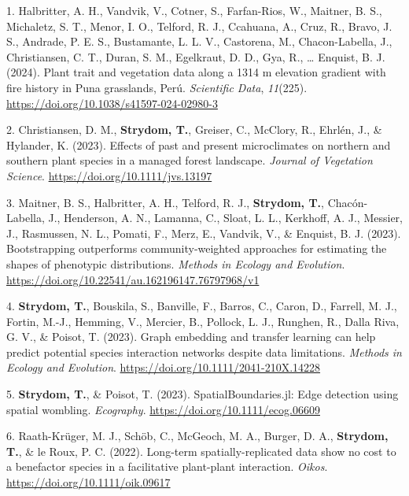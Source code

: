 \documentclass[11pt,a4paper,]{awesome-cv}
\newlength{\cslhangindent}
\newenvironment{CSLReferences}[2] %
 {\begin{list}{}{%
  \setlength{\itemindent}{0pt}
  \setlength{\leftmargin}{0pt}
  \setlength{\parsep}{0pt}
  \ifodd #1
   \setlength{\leftmargin}{\cslhangindent}
   \setlength{\itemindent}{-1\cslhangindent}
  \fi
  \setlength{\itemsep}{#2\baselineskip}}}
 {\end{list}}
\begin{document}
\label{refs-74b968ad60e589f8187efc0a7424e9aa}
\begin{CSLReferences}{1}{0}
1. Halbritter, A. H., Vandvik, V., Cotner, S., Farfan-Rios, W., Maitner,
B. S., Michaletz, S. T., Menor, I. O., Telford, R. J., Ccahuana, A.,
Cruz, R., Bravo, J. S., Andrade, P. E. S., Bustamante, L. L. V.,
Castorena, M., Chacon-Labella, J., Christiansen, C. T., Duran, S. M.,
Egelkraut, D. D., Gya, R., \ldots{} Enquist, B. J. (2024). Plant trait
and vegetation data along a 1314 m elevation gradient with fire history
in Puna grasslands, Perú. \emph{Scientific Data}, \emph{11}(225).
\url{https://doi.org/10.1038/s41597-024-02980-3}

2. Christiansen, D. M., \textbf{Strydom, T.}, Greiser, C., McClory, R.,
Ehrlén, J., \& Hylander, K. (2023). Effects of past and present
microclimates on northern and southern plant species in a managed forest
landscape. \emph{Journal of Vegetation Science}.
\url{https://doi.org/10.1111/jvs.13197}

3. Maitner, B. S., Halbritter, A. H., Telford, R. J.,
\textbf{Strydom, T.}, Chacón-Labella, J., Henderson, A. N., Lamanna, C.,
Sloat, L. L., Kerkhoff, A. J., Messier, J., Rasmussen, N. L., Pomati,
F., Merz, E., Vandvik, V., \& Enquist, B. J. (2023). Bootstrapping
outperforms community-weighted approaches for estimating the shapes of
phenotypic distributions. \emph{Methods in Ecology and Evolution}.
\url{https://doi.org/10.22541/au.162196147.76797968/v1}

4. \textbf{Strydom, T.}, Bouskila, S., Banville, F., Barros, C., Caron,
D., Farrell, M. J., Fortin, M.-J., Hemming, V., Mercier, B., Pollock, L.
J., Runghen, R., Dalla Riva, G. V., \& Poisot, T. (2023). Graph
embedding and transfer learning can help predict potential species
interaction networks despite data limitations. \emph{Methods in Ecology
and Evolution}. \url{https://doi.org/10.1111/2041-210X.14228}

5. \textbf{Strydom, T.}, \& Poisot, T. (2023). SpatialBoundaries.jl:
Edge detection using spatial wombling. \emph{Ecography}.
\url{https://doi.org/10.1111/ecog.06609}

6. Raath-Krüger, M. J., Schöb, C., McGeoch, M. A., Burger, D. A.,
\textbf{Strydom, T.}, \& le Roux, P. C. (2022). Long-term
spatially-replicated data show no cost to a benefactor species in a
facilitative plant-plant interaction. \emph{Oikos}.
\url{https://doi.org/10.1111/oik.09617}


\end{CSLReferences}
\end{document}
